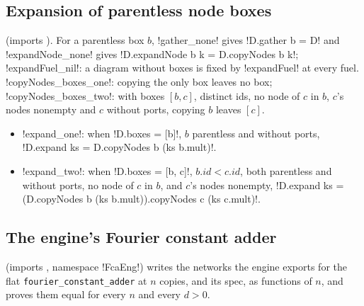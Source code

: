 {\subsection{Expansion of parentless node boxes}\label{sec:boxes-expand-parentless}

 (imports ). For a parentless box $b$, \lbx!gather_none! gives \lbx!D.gather b = D! and \lbx!expandNode_none! gives \lbx!D.expandNode b k = D.copyNodes b k!; \lbx!expandFuel_nil!: a diagram without boxes is fixed by \lbx!expandFuel! at every fuel. \lbx!copyNodes_boxes_one!: copying the only box leaves no box; \lbx!copyNodes_boxes_two!: with boxes $[b,c]$, distinct ids, no node of $c$ in $b$, $c$'s nodes nonempty and $c$ without ports, copying $b$ leaves $[c]$.
\begin{itemize}
\item \lbx!expand_one!: when \lbx!D.boxes = [b]!, $b$ parentless and without ports, \lbx!D.expand ks = D.copyNodes b (ks b.mult)!.
\item \lbx!expand_two!: when \lbx!D.boxes = [b, c]!, $b.\mathit{id}<c.\mathit{id}$, both parentless and without ports, no node of $c$ in $b$, and $c$'s nodes nonempty, \lbx!D.expand ks = (D.copyNodes b (ks b.mult)).copyNodes c (ks c.mult)!.
\end{itemize}

\subsection{The engine's Fourier constant adder}\label{sec:boxes-fca-eng}

 (imports , namespace \lbx!FcaEng!) writes the networks the engine exports for the flat \texttt{fourier\_constant\_adder} at $n$ copies, and its spec, as functions of $n$, and proves them equal for every $n$ and every $d>0$.

}

